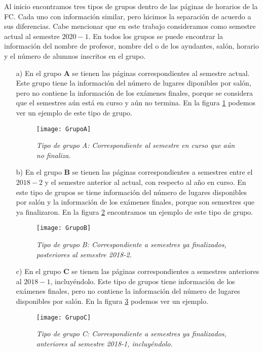 Al inicio encontramos tres tipos de grupos dentro de las páginas de horarios de la FC. Cada uno con información similar, pero hicimos la separación de acuerdo a sus diferencias. Cabe mencionar que en este trabajo consideramos como semestre actual al semestre $2020-1$. En todos los grupos se puede encontrar la información del nombre de profesor, nombre del o de los ayudantes, salón, horario y el número de alumnos inscritos en el grupo.

\begin{enumerate}
\item[a)] En el grupo \textbf{A} se tienen las páginas correspondientes al semestre actual. Este grupo tiene la información del número de lugares diponibles por salón, pero no contiene la información de los exámenes finales, porque se considera que el semestres aún está en curso y aún no termina. En la figura \ref{GpoA} podemos ver un ejemplo de este tipo de grupo.

\begin{figure}[H]
\centering
\texttt{[image: GrupoA]} %
\caption[\textit{Tipo de grupo A}]{\textit{Tipo de grupo A: Correspondiente al semestre en curso que aún no finaliza.}}\label{GpoA}
\end{figure}


\item[b)] En el grupo \textbf{B} se tienen las páginas correspondientes a semestres entre el $2018-2$ y el semestre anterior al actual, con respecto al año en curso. En este tipo de grupos se tiene información del número de lugares disponibles por salón y la información de los exámenes finales, porque son semestres que ya finalizaron. En la figura \ref{GpoB} encontramos un ejemplo de este tipo de grupo.

\begin{figure}[H]
\centering
\texttt{[image: GrupoB]} %
\caption[\textit{Tipo de grupo B}]{\textit{Tipo de grupo B: Correspondiente a semestres ya finalizados, posteriores al semestre 2018-2.}}\label{GpoB}
\end{figure}

\item[c)] En el grupo \textbf{C} se tienen las páginas correspondientes a semestres anteriores al $2018-1$, incluyéndolo. Este tipo de grupos tiene información de los exámenes finales, pero no contiene la información del número de lugares disponibles por salón. En la figura \ref{GpoC} podemos ver un ejemplo.

\begin{figure}[H]
\centering
\texttt{[image: GrupoC]} %
\caption[\textit{Tipo de grupo C}]{\textit{Tipo de grupo C: Correspondiente a semestres ya finalizados, anteriores al semestre 2018-1, incluyéndolo.}}\label{GpoC}
\end{figure}
\end{enumerate}



